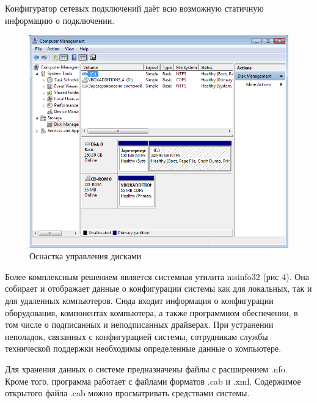 \documentclass[a4paper, 12pt]{report}		%
\begin{document}
Конфигуратор сетевых подключений даёт всю возможную статичную информацию о подключении.

\begin{figure}[h!]
\centering
\includegraphics[scale=0.7]{res/disks}
\caption{Оснастка управления дисками}
\end{figure}

\newpage
Более комплексным решением является системная утилита msinfo32 (рис 4). Она собирает и отображает данные о конфигурации системы как для локальных, так и для удаленных компьютеров. Сюда входит информация о конфигурации оборудования, компонентах компьютера, а также программном обеспечении, в том числе о подписанных и неподписанных драйверах. При устранении неполадок, связанных с конфигурацией системы, сотрудникам службы технической поддержки необходимы определенные данные о компьютере.

Для хранения данных о системе предназначены файлы с расширением .nfo. Кроме того, программа работает с файлами форматов .cab и .xml. Содержимое открытого файла .cab можно просматривать средствами системы.
\end{document}
